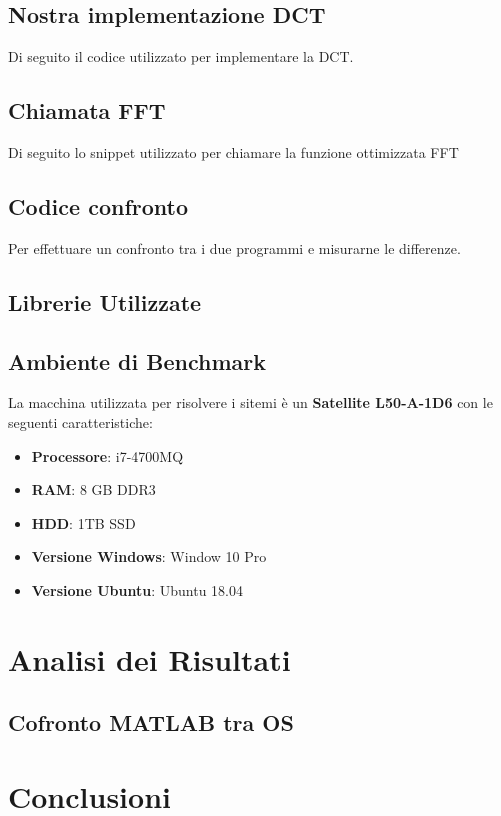 \documentclass[a4paper,12pt,titlepage,oneside]{book}
\begin{document}
    \section{Nostra implementazione DCT}
    Di seguito il codice utilizzato per implementare la DCT.
    
    \section{Chiamata FFT}
    Di seguito lo snippet utilizzato per chiamare la funzione ottimizzata FFT
    
    
    \section{Codice confronto}
    Per effettuare un confronto tra i due programmi e misurarne le differenze.

    
    \section{Librerie Utilizzate}
        
    
    \section{Ambiente di Benchmark}
    La macchina utilizzata per risolvere i sitemi è un \textbf{Satellite L50-A-1D6} con le seguenti caratteristiche:
    \begin{itemize}
      \item \textbf{Processore}: i7-4700MQ
      \item \textbf{RAM}: 8 GB DDR3
      \item \textbf{HDD}: 1TB SSD
      \item \textbf{Versione Windows}: Window 10 Pro
      \item \textbf{Versione Ubuntu}: Ubuntu 18.04
    \end{itemize}
    
\chapter{Analisi dei Risultati}
    \section{Cofronto MATLAB tra OS}
    

\chapter{Conclusioni}

\nocite{*}
\printbibliography
\end{document}
